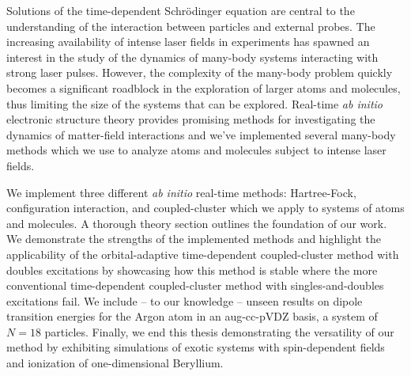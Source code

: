 Solutions of the time-dependent Schrödinger equation are central to the
understanding of the interaction between particles and external probes.
The increasing availability of intense laser fields in experiments has spawned
an interest in the study of the dynamics of many-body systems interacting with
strong laser pulses.
However, the complexity of the many-body problem quickly becomes a significant
roadblock in the exploration of larger atoms and molecules, thus limiting the
size of the systems that can be explored.
Real-time \textit{ab initio} electronic structure theory provides promising
methods for investigating the dynamics of matter-field interactions and we've
implemented several many-body methods which we use to analyze atoms and
molecules subject to intense laser fields.

We implement three different \emph{ab initio} real-time methods: Hartree-Fock,
configuration interaction, and coupled-cluster which we apply to systems of
atoms and molecules.
A thorough theory section outlines the foundation of our work.
We demonstrate the strengths of the implemented methods and highlight the
applicability of the orbital-adaptive time-dependent coupled-cluster method with
doubles excitations by showcasing how this method is stable where the more
conventional time-dependent coupled-cluster method with singles-and-doubles
excitations fail.
We include -- to our knowledge -- unseen results on dipole transition energies
for the Argon atom in an aug-cc-pVDZ basis, a system of $N = 18$ particles.
Finally, we end this thesis demonstrating the versatility of our method by
exhibiting simulations of exotic systems with spin-dependent fields and
ionization of one-dimensional Beryllium.
